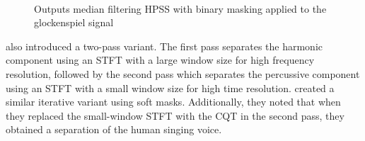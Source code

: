 \documentclass[report.tex]{subfiles}
\begin{document}
\begin{figure}[ht]
	\centering
	\\
	\caption{Outputs median filtering HPSS with binary masking applied to the glockenspiel signal}
	\label{fig:fitz12}
\end{figure}

\textcite{driedger} also introduced a two-pass variant. The first pass separates the harmonic component using an STFT with a large window size for high frequency resolution, followed by the second pass which separates the percussive component using an STFT with a small window size for high time resolution. \textcite{fitzgerald2} created a similar iterative variant using soft masks. Additionally, they noted that when they replaced the small-window STFT with the CQT in the second pass, they obtained a separation of the human singing voice.
\end{document}
